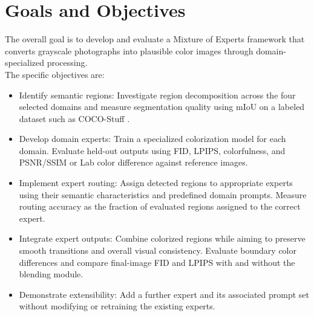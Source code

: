 \documentclass{FastFyp}
\begin{document}
\section{Goals and Objectives}
The overall goal is to develop and evaluate a Mixture of Experts framework that converts grayscale photographs into plausible color images through domain-specialized processing.\\
The specific objectives are:
\begin{itemize}
    \item  Identify semantic regions: Investigate region decomposition across the four selected domains and measure segmentation quality using mIoU on a labeled dataset such as COCO-Stuff \cite{caesar2018cocostuff}.
    \item Develop domain experts: Train a specialized colorization model for each domain. Evaluate held-out outputs using FID, LPIPS, colorfulness, and PSNR/SSIM or Lab color difference against reference images.
    \item Implement expert routing: Assign detected regions to appropriate experts using their semantic characteristics and predefined domain prompts. Measure routing accuracy as the fraction of evaluated regions assigned to the correct expert.
    \item Integrate expert outputs: Combine colorized regions while aiming to preserve smooth transitions and overall visual consistency. Evaluate boundary color differences and compare final-image FID and LPIPS with and without the blending module.
    \item Demonstrate extensibility: Add a further expert and its associated prompt set without modifying or retraining the existing experts.
\end{itemize}
\end{document}
